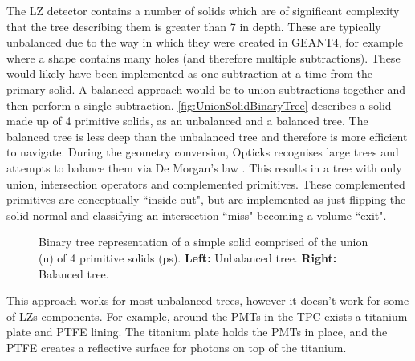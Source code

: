 \par
The LZ detector contains a number of solids which are of significant complexity that the tree describing them is greater than 7 in depth.
These are typically unbalanced due to the way in which they were created in GEANT4, for example where a shape contains many holes (and therefore multiple subtractions).
These would likely have been implemented as one subtraction at a time from the primary solid.
A balanced approach would be to union subtractions together and then perform a single subtraction.
\autoref{fig:UnionSolidBinaryTree} describes a solid made up of 4 primitive solids, as an unbalanced and a balanced tree.
The balanced tree is less deep than the unbalanced tree and therefore is more efficient to navigate.
During the geometry conversion, Opticks recognises large trees and attempts to balance them via De Morgan's law \cite{Opticks_CHEP_2019_ref}.
This results in a tree with only union, intersection operators and complemented primitives.
These complemented primitives are conceptually ``inside-out", but are implemented as just flipping the solid normal and classifying an intersection ``miss" becoming a volume ``exit".
\begin{figure}
\centering 
{}
\caption{Binary tree representation of a simple solid comprised of the union (u) of 4 primitive solids (ps). \textbf{Left:} Unbalanced tree. \textbf{Right:} Balanced tree.}
\label{fig:UnionSolidBinaryTree}
\end{figure}
\par
This approach works for most unbalanced trees, however it doesn't work for some of LZs components.
For example, around the PMTs in the TPC exists a titanium plate and PTFE lining.
The titanium plate holds the PMTs in place, and the PTFE creates a reflective surface for photons on top of the titanium.
